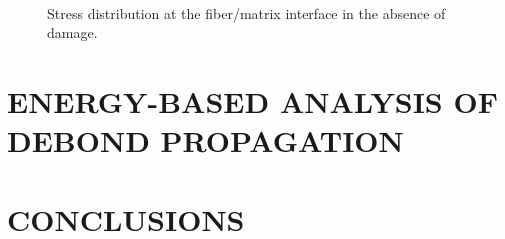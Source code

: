 \documentclass[12pt,a4paper]{article}
\begin{document}
\begin{figure}[!h]
    \ 
\caption{Stress distribution at the fiber/matrix interface in the absence of damage.}\label{fig:stress}
\end{figure}

\section{ENERGY-BASED ANALYSIS OF DEBOND PROPAGATION}

\section{CONCLUSIONS}
\end{document}
